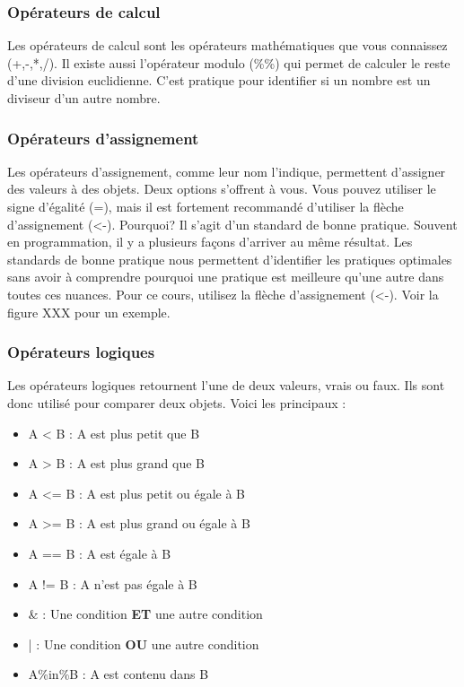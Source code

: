 \documentclass[10.5pt,a4paper]{article}
\begin{document}
    \subsubsection{Opérateurs de calcul}
    Les opérateurs de calcul sont les opérateurs mathématiques que vous connaissez (+,-,*,/). Il existe aussi l'opérateur modulo (\%\%) qui permet de calculer le reste d'une division euclidienne. C'est pratique pour identifier si un nombre est un diviseur d'un autre nombre.  

      
    \subsubsection{Opérateurs d'assignement}
    Les opérateurs d'assignement, comme leur nom l'indique, permettent d'assigner des valeurs à des objets. Deux options s'offrent à vous. Vous pouvez utiliser le signe d'égalité (=), mais il est fortement recommandé d'utiliser la flèche d'assignement (<-). Pourquoi? Il s'agit d'un standard de bonne pratique. Souvent en programmation, il y a plusieurs façons d'arriver au même résultat. Les standards de bonne pratique nous permettent d'identifier les pratiques optimales sans avoir à comprendre pourquoi une pratique est meilleure qu'une autre dans toutes ces nuances. Pour ce cours, utilisez la flèche d'assignement (<-). Voir la figure XXX pour un exemple.

    
    \subsubsection{Opérateurs logiques}
    Les opérateurs logiques retournent l'une de deux valeurs, vrais ou faux. Ils sont donc utilisé pour comparer deux objets. Voici les principaux : 
    \begin{itemize}
      \item A < B    : A est plus petit que B
      \item A > B    : A est plus grand que B
      \item A <= B   : A est plus petit ou égale à B
      \item A >= B   : A est plus grand ou égale à B
      \item A == B   : A est égale à B
      \item A != B   : A n'est pas égale à B
      \item \&       : Une condition \textbf{ET} une autre condition
      \item |        : Une condition \textbf{OU} une autre condition
      \item A\%in\%B : A est contenu dans B
    \end{itemize}
    
\end{document}
